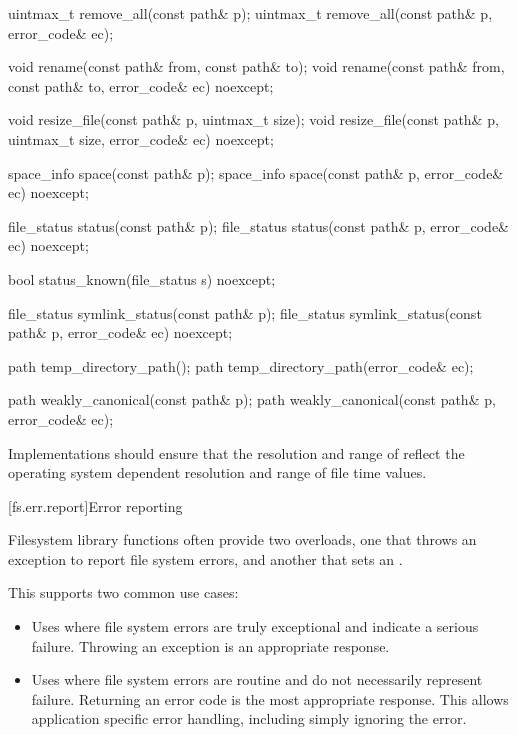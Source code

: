 \begin{codeblock}
{  uintmax_t remove_all(const path& p);
  uintmax_t remove_all(const path& p, error_code& ec);

  void rename(const path& from, const path& to);
  void rename(const path& from, const path& to, error_code& ec) noexcept;

  void resize_file(const path& p, uintmax_t size);
  void resize_file(const path& p, uintmax_t size, error_code& ec) noexcept;

  space_info space(const path& p);
  space_info space(const path& p, error_code& ec) noexcept;

  file_status status(const path& p);
  file_status status(const path& p, error_code& ec) noexcept;

  bool status_known(file_status s) noexcept;

  file_status symlink_status(const path& p);
  file_status symlink_status(const path& p, error_code& ec) noexcept;

  path temp_directory_path();
  path temp_directory_path(error_code& ec);

  path weakly_canonical(const path& p);
  path weakly_canonical(const path& p, error_code& ec);
}
\end{codeblock}

\pnum
Implementations should ensure that the resolution and range of
 reflect the operating system dependent resolution and range
of file time values.

[fs.err.report]{Error reporting}

\pnum
Filesystem library functions often provide two overloads, one that
throws an exception to report file system errors, and another that sets an .
\begin{note}
This supports two common use cases:
\begin{itemize}
\item
Uses where file system errors are truly exceptional
and indicate a serious failure.
Throwing an exception is an appropriate response.
\item
Uses where file system errors are routine
and do not necessarily represent failure.
Returning an error code is the most appropriate response.
This allows application specific error handling, including simply ignoring the error.
\end{itemize}
\end{note}

